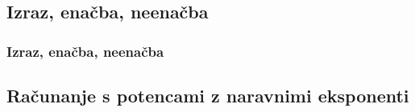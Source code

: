     \subsection{Izraz, enačba, neenačba}

        \begin{frame}
            \frametitle{Izraz, enačba, neenačba}
        \end{frame}





    \subsection{Računanje s potencami z naravnimi eksponenti}


